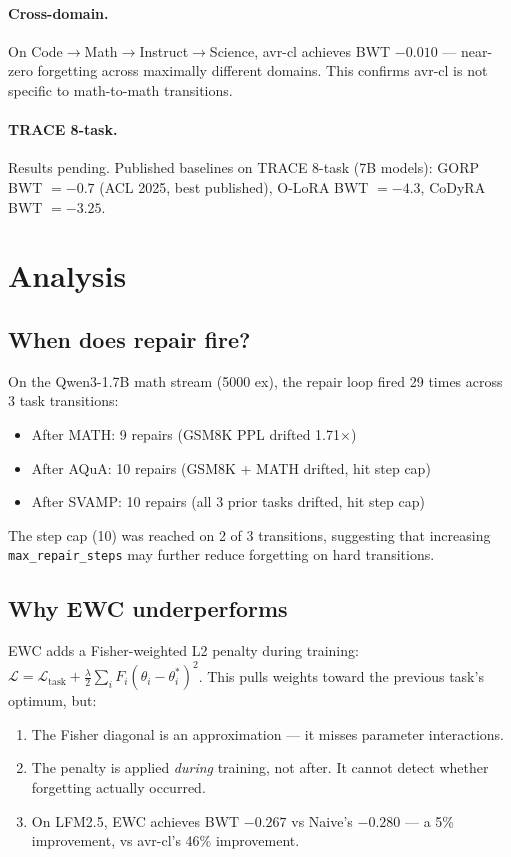 \documentclass{article}
\begin{document}
\paragraph{Cross-domain.} On Code$\to$Math$\to$Instruct$\to$Science, avr-cl achieves BWT $-0.010$ — near-zero forgetting across maximally different domains. This confirms avr-cl is not specific to math-to-math transitions.

\paragraph{TRACE 8-task.} Results pending. Published baselines on TRACE 8-task (7B models): GORP BWT $= -0.7$ (ACL 2025, best published), O-LoRA BWT $= -4.3$, CoDyRA BWT $= -3.25$.

\section{Analysis}

\subsection{When does repair fire?}

On the Qwen3-1.7B math stream (5000 ex), the repair loop fired 29 times across 3 task transitions:
\begin{itemize}
    \item After MATH: 9 repairs (GSM8K PPL drifted 1.71$\times$)
    \item After AQuA: 10 repairs (GSM8K + MATH drifted, hit step cap)
    \item After SVAMP: 10 repairs (all 3 prior tasks drifted, hit step cap)
\end{itemize}

The step cap (10) was reached on 2 of 3 transitions, suggesting that increasing \texttt{max\_repair\_steps} may further reduce forgetting on hard transitions.

\subsection{Why EWC underperforms}

EWC adds a Fisher-weighted L2 penalty during training: $\mathcal{L} = \mathcal{L}_{\text{task}} + \frac{\lambda}{2} \sum_i F_i (\theta_i - \theta_i^*)^2$. This pulls weights toward the previous task's optimum, but:
\begin{enumerate}
    \item The Fisher diagonal is an approximation — it misses parameter interactions.
    \item The penalty is applied \emph{during} training, not after. It cannot detect whether forgetting actually occurred.
    \item On LFM2.5, EWC achieves BWT $-0.267$ vs Naive's $-0.280$ — a 5\% improvement, vs avr-cl's 46\% improvement.
\end{enumerate}
\end{document}

